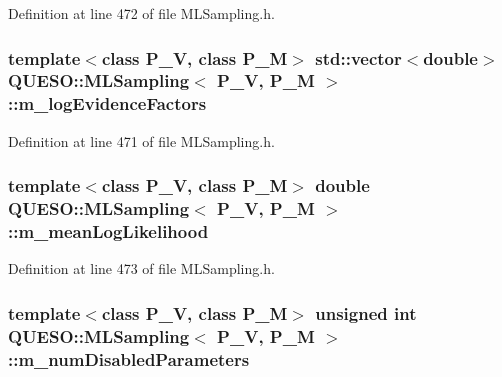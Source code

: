 Definition at line 472 of file M\-L\-Sampling.\-h.

\hypertarget{class_q_u_e_s_o_1_1_m_l_sampling_a75f2ceab4a2c6774b3fa07d74221dbf3}{
\subsubsection[{m\-\_\-log\-Evidence\-Factors}]{\setlength{\rightskip}{0pt plus 5cm}template$<$class P\-\_\-\-V, class P\-\_\-\-M$>$ std\-::vector$<$double$>$ {\bf Q\-U\-E\-S\-O\-::\-M\-L\-Sampling}$<$ P\-\_\-\-V, P\-\_\-\-M $>$\-::m\-\_\-log\-Evidence\-Factors\hspace{0.3cm}{\ttfamily [private]}}}\label{class_q_u_e_s_o_1_1_m_l_sampling_a75f2ceab4a2c6774b3fa07d74221dbf3}


Definition at line 471 of file M\-L\-Sampling.\-h.

\hypertarget{class_q_u_e_s_o_1_1_m_l_sampling_aec4229773274b58e3eaa49a77738389f}{
\subsubsection[{m\-\_\-mean\-Log\-Likelihood}]{\setlength{\rightskip}{0pt plus 5cm}template$<$class P\-\_\-\-V, class P\-\_\-\-M$>$ double {\bf Q\-U\-E\-S\-O\-::\-M\-L\-Sampling}$<$ P\-\_\-\-V, P\-\_\-\-M $>$\-::m\-\_\-mean\-Log\-Likelihood\hspace{0.3cm}{\ttfamily [private]}}}\label{class_q_u_e_s_o_1_1_m_l_sampling_aec4229773274b58e3eaa49a77738389f}


Definition at line 473 of file M\-L\-Sampling.\-h.

\hypertarget{class_q_u_e_s_o_1_1_m_l_sampling_afbe27e6149562020663b72da6592d933}{
\subsubsection[{m\-\_\-num\-Disabled\-Parameters}]{\setlength{\rightskip}{0pt plus 5cm}template$<$class P\-\_\-\-V, class P\-\_\-\-M$>$ unsigned int {\bf Q\-U\-E\-S\-O\-::\-M\-L\-Sampling}$<$ P\-\_\-\-V, P\-\_\-\-M $>$\-::m\-\_\-num\-Disabled\-Parameters\hspace{0.3cm}{\ttfamily [private]}}}\label{class_q_u_e_s_o_1_1_m_l_sampling_afbe27e6149562020663b72da6592d933}



